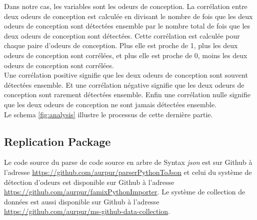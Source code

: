 Dans notre cas, les variables sont les odeurs de conception. La corrélation entre deux odeurs de conception est
calculée en divisant le nombre de fois que les deux odeurs de conception sont
détectées ensemble par le nombre total de fois que les deux odeurs de conception
sont détectées. Cette corrélation est calculée pour chaque paire d'odeurs de
conception. Plus elle est proche de 1, plus les deux odeurs de conception sont
corrélées, et plus elle est proche de 0, moins les deux odeurs de conception
sont corrélées.\\

Une corrélation positive signifie que les deux odeurs de conception
sont souvent détectées ensemble. Et une corrélation négative signifie que les deux odeurs de conception sont rarement
détectées ensemble. Enfin une corrélation nulle signifie que les deux odeurs de
conception ne sont jamais détectées ensemble.\\

Le schema \ref{fig:analysis} illustre le processus de cette dernière partie.\\

\subsection{Replication Package}
\label{sec:Replication Package}
Le code source du parse de code source en arbre de Syntax \emph{json} est sur
Github à l'adresse \url{https://github.com/aurpur/parserPythonToJson} et celui du
système de détection d'odeurs est disponible sur Github à l'adresse
\url{https://github.com/aurpur/famixPythonImporter}. Le système
de collection de données est aussi disponible sur Github à l'adresse
\url{https://github.com/aurpur/ms-github-data-collection}.\\
